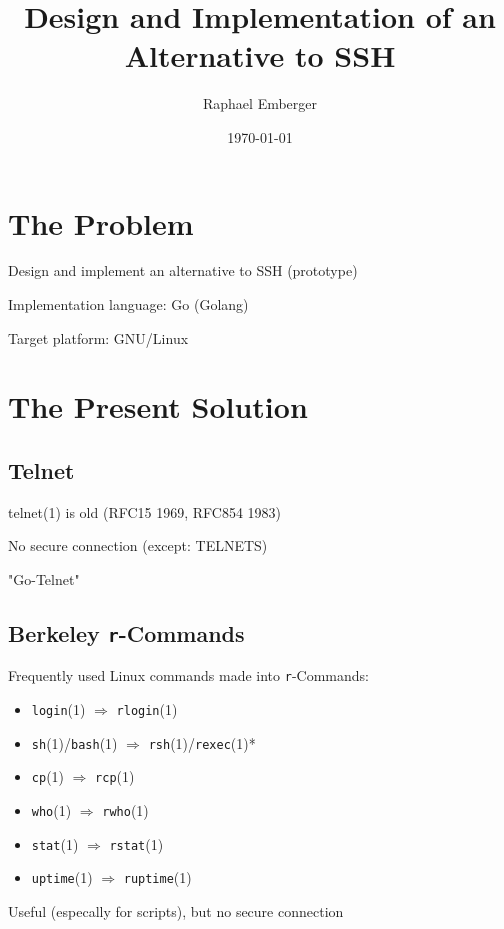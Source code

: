 \documentclass[
	xcolor=dvipsnames,
	handout
]{beamer}
\title{Design and Implementation of an Alternative to SSH}
\date{\today}
\author{Raphael Emberger}
\newenvironment{zhawframe}[1][]
{\begin{frame}[environment=fr,#1]{\insertsubsectionhead}{\insertsectionhead}}
{\end{frame}
}
\begin{document}
\maketitle


\section{The Problem}
\begin{zhawframe}
 Design and implement an alternative to SSH (prototype)

 Implementation language: Go (Golang)

 Target platform: GNU/Linux
\end{zhawframe}

\section{The Present Solution}
\subsection{Telnet}
\begin{zhawframe}
 telnet(1) is old (RFC15 1969, RFC854 1983)

 No secure connection (except: TELNETS)

 "Go-Telnet"
\end{zhawframe}

\subsection{Berkeley \texttt{r}-Commands}
\begin{zhawframe}
Frequently used Linux commands made into \texttt{r}-Commands:
\begin{itemize}
\item \texttt{login}(1) $\Rightarrow$ \texttt{rlogin}(1)
\item \texttt{sh}(1)/\texttt{bash}(1) $\Rightarrow$ \texttt{rsh}(1)/\texttt{rexec}(1)*
\item \texttt{cp}(1) $\Rightarrow$ \texttt{rcp}(1)
\item \texttt{who}(1) $\Rightarrow$ \texttt{rwho}(1)
\item \texttt{stat}(1) $\Rightarrow$ \texttt{rstat}(1)
\item \texttt{uptime}(1) $\Rightarrow$ \texttt{ruptime}(1)
\end{itemize}
Useful (especally for scripts), but no secure connection
\end{zhawframe}
\end{document}
